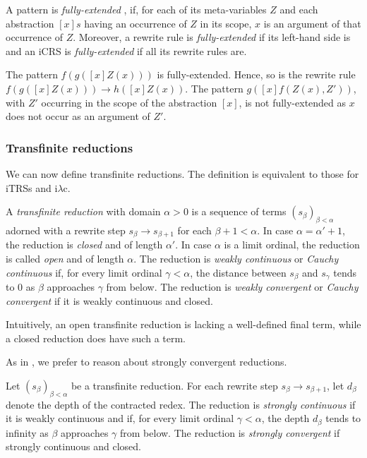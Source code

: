 \documentclass{LMCS}
\theoremstyle{plain}
\theoremstyle{definition}
\newcommand{\rew}{\rightarrow}
\newcommand{\iLC}{i$\lambda$c\xspace}
\begin{document}
\begin{defi}
\label{def:fully_extended}
A pattern is \emph{fully-extended} \cite{HP96,O96}, if, for each of
its meta-variables $Z$ and each abstraction $[x]s$ having an
occurrence of $Z$ in its scope, $x$ is an argument of that occurrence
of $Z$. Moreover, a rewrite rule is \emph{fully-extended} if its
left-hand side is and an iCRS is \emph{fully-extended} if all its
rewrite rules are.
\end{defi}

\begin{exa}
The pattern $f(g([x]Z(x)))$ is fully-extended. Hence, so is the rewrite
rule $f(g([x]Z(x))) \rightarrow h([x]Z(x))$. The pattern $g([x]f(Z(x),Z'))$, with $Z'$ occurring in the scope of the abstraction $[x]$, is not fully-extended as $x$ does not occur as an argument of $Z'$.
\end{exa}



\subsubsection{Transfinite reductions}

We can now define transfinite reductions.
The definition is equivalent to those for iTRSs and \iLC \cite{KKSV95,KKSV97}.
\begin{defi}
A \emph{transfinite reduction} with domain $\alpha > 0$ is a sequence
of terms $(s_\beta)_{\beta < \alpha}$ adorned with a rewrite step
$s_\beta \rew s_{\beta + 1}$ for each $\beta + 1 < \alpha$. In case $\alpha = \alpha' + 1$,
the reduction is \emph{closed} and of length $\alpha'$. In case
$\alpha$ is a limit ordinal, the reduction is called \emph{open} and
of length $\alpha$. The reduction is \emph{weakly continuous} or
\emph{Cauchy continuous} if, for every limit ordinal $\gamma < \alpha$, the distance between $s_\beta$ and $s_\gamma$ tends to $0$ as $\beta$ approaches $\gamma$ from below. The reduction is \emph{weakly convergent} or \emph{Cauchy convergent} if it is weakly continuous and closed.
\end{defi}
\noindent Intuitively, an open transfinite reduction is lacking a well-defined final term, while a closed reduction does have such a term. 

As in \cite{KKSV95,KKSV97,T03_KV}, we prefer to reason about strongly
convergent reductions.

\begin{defi}
Let $(s_\beta)_{\beta < \alpha}$ be a transfinite reduction. For each
rewrite step $s_\beta \rew s_{\beta + 1}$, let $d_\beta$ denote the
depth of the contracted redex. The reduction is \emph{strongly
  continuous} if it is weakly continuous and if, for every limit ordinal $\gamma < \alpha$, the depth $d_\beta$ tends to infinity as $\beta$ approaches $\gamma$ from below. The reduction is \emph{strongly convergent} if strongly continuous and closed.
\end{defi}
\end{document}
